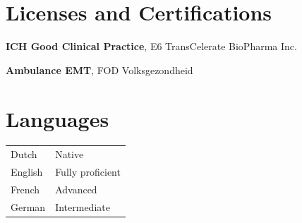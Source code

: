 \documentclass[10pt,a4paper]{article}
\begin{document}
\section*{Licenses and Certifications}

\textbf{ICH Good Clinical Practice}, E6 TransCelerate BioPharma Inc.
\smallskip

\textbf{Ambulance EMT}, FOD Volksgezondheid \\

\section*{Languages}
\begin{tabularx}{\linewidth}{@{}p{1.2in} X@{}}
	Dutch   & Native           \\
	English & Fully proficient \\
	French  & Advanced         \\
	German  & Intermediate     \\
\end{tabularx}
\end{document}

